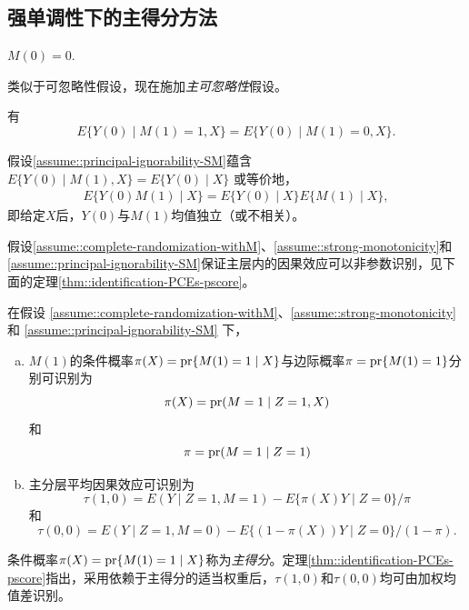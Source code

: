\subsection{强单调性下的主得分方法}

\begin{assumption}
[强单调性]\label{assume::strong-monotonicity}
 $M(0) = 0$. 
\end{assumption}


类似于可忽略性假设，现在施加{\it 主可忽略性}假设。 


\begin{assumption}
[主可忽略性]\label{assume::principal-ignorability-SM}
有
$$
E\{  Y(0) \mid M(1) = 1, X \} = E\{  Y(0) \mid M(1) = 0, X \} .
$$ 
\end{assumption}


假设\ref{assume::principal-ignorability-SM}蕴含
$
E\{  Y(0) \mid M(1)  , X \} = E\{  Y(0) \mid   X \} 
$
或等价地，
\begin{eqnarray}
\label{eq::mean-independent}
E\{  Y(0)  M(1)  \mid  X \}  =  E\{  Y(0) \mid   X \}  E\{     M(1)  \mid  X \}  ,
\end{eqnarray}
即给定$X$后，$Y(0)$与$M(1)$均值独立（或不相关）。 

假设\ref{assume::complete-randomization-withM}、\ref{assume::strong-monotonicity}和\ref{assume::principal-ignorability-SM}保证主层内的因果效应可以非参数识别，见下面的定理\ref{thm::identification-PCEs-pscore}。 


\begin{theorem}
\label{thm::identification-PCEs-pscore}
在假设 \ref{assume::complete-randomization-withM}、\ref{assume::strong-monotonicity} 和 \ref{assume::principal-ignorability-SM} 下， 
\begin{enumerate}
[(a)]
\item 
$M(1)$的条件概率$\pi(X) =  \textup{pr}\{ M(1)=1\mid X \}  $与边际概率$\pi =  \textup{pr}\{ M(1)=1\} $分别可识别为
$$
\pi(X)   =  \textup{pr}(M=1\mid Z=1, X ) 
$$
和
$$
\pi  =   \textup{pr}(M=1\mid Z=1 ) 
$$ 
\item
主分层平均因果效应可识别为
$$
\tau(1,0) = E(Y\mid Z=1, M=1)  - E\{  \pi(X) Y  \mid Z=0 \}/\pi 
$$
和
$$
\tau(0,0) = E(Y\mid Z=1, M=0)  - E\{ (1-\pi(X)) Y  \mid Z=0 \}/(1-\pi) . 
$$
\end{enumerate}
\end{theorem}


条件概率$\pi(X) =  \textup{pr}\{ M(1)=1\mid X \} $称为{\it 主得分}。定理\ref{thm::identification-PCEs-pscore}指出，采用依赖于主得分的适当权重后，$\tau(1,0) $和$\tau(0,0)$均可由加权均值差识别。 



